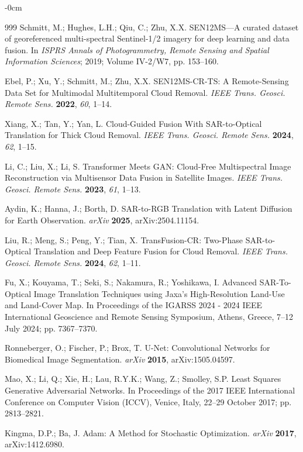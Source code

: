 \documentclass[remotesensing,article,submit,pdftex,moreauthors]{Definitions/mdpi}
\begin{document}
\begin{adjustwidth}{-\extralength}{0cm}
\begin{thebibliography}{999}
Schmitt, M.; Hughes, L.H.; Qiu, C.; Zhu, X.X. SEN12MS—A curated dataset of georeferenced multi-spectral Sentinel-1/2 imagery for deep learning and data fusion. In {\em ISPRS Annals of Photogrammetry, Remote Sensing and Spatial Information Sciences}; 2019; Volume IV-2/W7, pp. 153--160.

Ebel, P.; Xu, Y.; Schmitt, M.; Zhu, X.X. SEN12MS-CR-TS: A Remote-Sensing Data Set for Multimodal Multitemporal Cloud Removal. {\em IEEE Trans. Geosci. Remote Sens.} {\bf 2022}, {\em 60}, 1--14.

Xiang, X.; Tan, Y.; Yan, L. Cloud-Guided Fusion With SAR-to-Optical Translation for Thick Cloud Removal. {\em IEEE Trans. Geosci. Remote Sens.} {\bf 2024}, {\em 62}, 1--15.

Li, C.; Liu, X.; Li, S. Transformer Meets GAN: Cloud-Free Multispectral Image Reconstruction via Multisensor Data Fusion in Satellite Images. {\em IEEE Trans. Geosci. Remote Sens.} {\bf 2023}, {\em 61}, 1--13.

Aydin, K.; Hanna, J.; Borth, D. SAR-to-RGB Translation with Latent Diffusion for Earth Observation. {\em arXiv} {\bf 2025}, arXiv:2504.11154.

Liu, R.; Meng, S.; Peng, Y.; Tian, X. TransFusion-CR: Two-Phase SAR-to-Optical Translation and Deep Feature Fusion for Cloud Removal. {\em IEEE Trans. Geosci. Remote Sens.} {\bf 2024}, {\em 62}, 1--11.

Fu, X.; Kouyama, T.; Seki, S.; Nakamura, R.; Yoshikawa, I. Advanced SAR-To-Optical Image Translation Techniques using Jaxa's High-Resolution Land-Use and Land-Cover Map. In Proceedings of the IGARSS 2024 - 2024 IEEE International Geoscience and Remote Sensing Symposium, Athens, Greece, 7–12 July 2024; pp. 7367--7370.

Ronneberger, O.; Fischer, P.; Brox, T. U-Net: Convolutional Networks for Biomedical Image Segmentation. {\em arXiv} {\bf 2015}, arXiv:1505.04597.

Mao, X.; Li, Q.; Xie, H.; Lau, R.Y.K.; Wang, Z.; Smolley, S.P. Least Squares Generative Adversarial Networks. In Proceedings of the 2017 IEEE International Conference on Computer Vision (ICCV), Venice, Italy, 22–29 October 2017; pp. 2813--2821.

Kingma, D.P.; Ba, J. Adam: A Method for Stochastic Optimization. {\em arXiv} {\bf 2017}, arXiv:1412.6980.


\end{thebibliography}
\end{adjustwidth}
\end{document}
